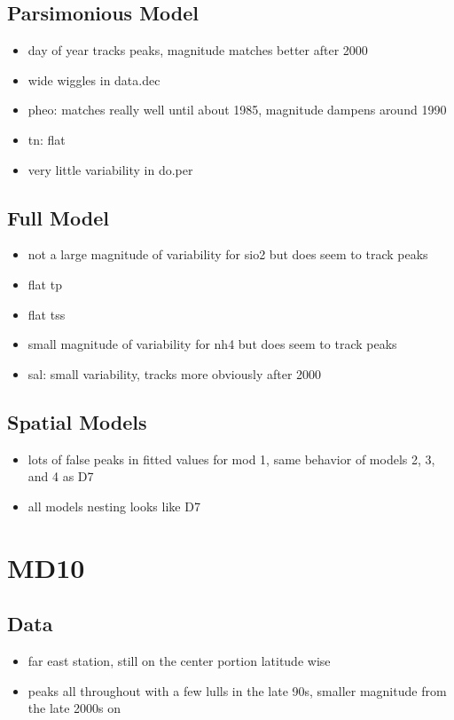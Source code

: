 \documentclass[12pt]{amsart}
\begin{document}
\subsection{Parsimonious Model}
\begin{itemize}
\item day of year tracks peaks, magnitude matches better after 2000
\item wide wiggles in data.dec
\item pheo:  matches really well until about 1985, magnitude dampens around 1990
\item tn: flat
\item very little variability in do.per
\end{itemize}
\subsection{Full Model}
\begin{itemize}
\item not a large magnitude of variability for sio2 but does seem to track peaks
\item flat tp
\item flat tss
\item small magnitude of variability for nh4 but does seem to track peaks
\item sal: small variability, tracks more obviously after 2000
\end{itemize}

\subsection{Spatial Models}

\begin{itemize}
\item lots of false peaks in fitted values for mod 1, same behavior of models 2, 3, and 4 as D7
\item all models nesting looks like D7 
\end{itemize}

\section{MD10}
\subsection{Data}
\begin{itemize}
\item far east station, still on the center portion latitude wise
\item peaks all throughout with a few lulls in the late 90s, smaller magnitude from the late 2000s on
\end{itemize}
\end{document}

